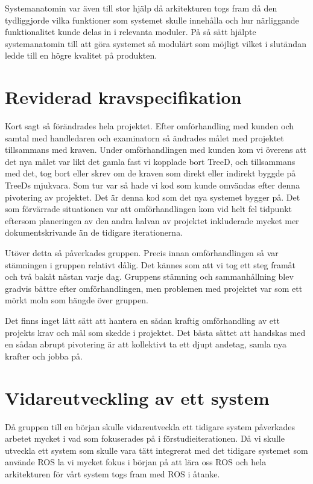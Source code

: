 Systemanatomin var även till stor hjälp då arkitekturen togs fram då den tydliggjorde vilka funktioner som systemet skulle innehålla och hur närliggande funktionalitet kunde delas in i relevanta moduler. På så sätt hjälpte systemanatomin till att göra systemet så modulärt som möjligt vilket i slutändan ledde till en högre kvalitet på produkten.

\section{Reviderad kravspecifikation}
Kort sagt så förändrades hela projektet. Efter omförhandling med kunden och samtal med handledaren och examinatorn så ändrades målet med projektet tillsammans med kraven. Under omförhandlingen med kunden kom vi överens att det nya målet var likt det gamla fast vi kopplade bort TreeD, och tillsammans med det, tog bort eller skrev om de kraven som direkt eller indirekt byggde på TreeDs mjukvara. Som tur var så hade vi kod som kunde omvändas efter denna pivotering  
av projektet. Det är denna kod som det nya systemet bygger på. Det som förvärrade situationen var att omförhandlingen kom vid helt fel tidpunkt eftersom planeringen av den andra halvan av projektet inkluderade mycket mer dokumentskrivande än de tidigare iterationerna.

Utöver detta så påverkades gruppen. Precis innan omförhandlingen så var stämningen i gruppen relativt dålig. Det kännes som att vi tog ett steg framåt och två bakåt nästan varje dag. Gruppens stämning och sammanhållning blev gradvis bättre efter omförhandlingen, men problemen med projektet var som ett mörkt moln som hängde över gruppen.

Det finns inget lätt sätt att hantera en sådan kraftig omförhandling av ett projekts krav och mål som skedde i projektet. Det bästa sättet att handskas med en sådan abrupt pivotering är att kollektivt ta ett djupt andetag, samla nya krafter och jobba på.

\section{Vidareutveckling av ett system}
Då gruppen till en början skulle vidareutveckla ett tidigare system påverkades arbetet mycket i vad som fokuserades på i förstudieiterationen. Då vi skulle utveckla ett system som skulle vara tätt integrerat med det tidigare systemet som använde ROS la vi mycket fokus i början på att lära oss ROS och hela arkitekturen för vårt system togs fram med ROS i åtanke.

